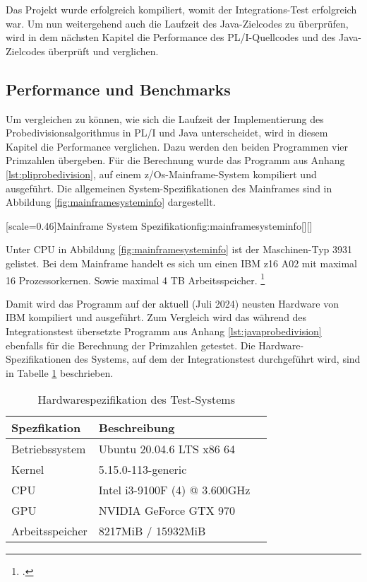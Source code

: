 Das Projekt wurde erfolgreich kompiliert, womit der Integrations-Test erfolgreich war. Um nun weitergehend auch die Laufzeit des Java-Zielcodes zu überprüfen, wird in dem nächsten Kapitel die Performance des PL/I-Quellcodes und des Java-Zielcodes überprüft und verglichen. 
\pagebreak


\subsection{Performance und Benchmarks}
Um vergleichen zu können, wie sich die Laufzeit der Implementierung des Probedivisionsalgorithmus in PL/I und Java unterscheidet, wird in diesem Kapitel die Performance verglichen. 
Dazu werden den beiden Programmen vier Primzahlen übergeben. Für die Berechnung wurde das Programm aus Anhang \ref{lst:pliprobedivision}, auf einem z/Os-Mainframe-System kompiliert und ausgeführt. 
Die allgemeinen System-Spezifikationen des Mainframes sind in Abbildung \ref{fig:mainframesysteminfo} dargestellt.

[scale=0.46]{Mainframe System Spezifikation}{fig:mainframesysteminfo}[][]

Unter CPU in Abbildung \ref{fig:mainframesysteminfo} ist der Maschinen-Typ 3931 gelistet. Bei dem Mainframe handelt es sich um einen IBM z16 A02 mit
maximal 16 Prozessorkernen. Sowie maximal 4 TB Arbeitsspeicher. \footcite{z16}

Damit wird das Programm auf der aktuell (Juli 2024) neusten Hardware von IBM kompiliert und ausgeführt. Zum Vergleich wird das während des Integrationstest übersetzte Programm aus Anhang \ref{lst:javaprobedivision} ebenfalls für die Berechnung der Primzahlen getestet. 
Die Hardware-Spezifikationen des Systems, auf dem der Integrationstest durchgeführt wird, sind in Tabelle \ref{tab:hardwartable} beschrieben.

\begin{table}[h]
	\centering
	\begin{tabularx}{\textwidth}{|X|X|X|}
		\hline
		\textbf{Spezfikation} & \textbf{Beschreibung}  \\
		\hline
		Betriebssystem & Ubuntu 20.04.6 LTS x86 64 \\
		
		Kernel & 5.15.0-113-generic  \\
		
		CPU & Intel i3-9100F (4) @ 3.600GHz \\
		
		GPU & NVIDIA GeForce GTX 970  \\
		
		Arbeitsspeicher & 8217MiB / 15932MiB \\
		\hline
		
	\end{tabularx}
	\caption{Hardwarespezifikation des Test-Systems \label{tab:hardwartable}}
\end{table}


